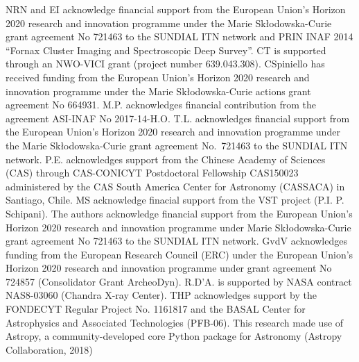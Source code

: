 \documentclass[usenatbib]{mnras}
\begin{document}
NRN and EI acknowledge financial support from the European Union's Horizon
2020 research and innovation programme under the Marie Sk\l{}odowska-Curie
grant agreement No 721463 to the SUNDIAL ITN network and  PRIN INAF 2014 
``Fornax Cluster Imaging and Spectroscopic Deep Survey''.
CT is supported through an NWO-VICI grant (project number 639.043.308).
CSpiniello has received funding from the European Union's Horizon 2020 
research and innovation programme under the Marie Sk\l{}odowska-Curie
actions grant agreement No 664931.
M.P. acknowledges financial contribution from the agreement ASI-INAF No 2017-14-H.O.
T.L. acknowledges financial support from the European Union's Horizon 2020 
research and innovation programme under the Marie Sk\l{}odowska-Curie 
grant agreement No.~721463 to the SUNDIAL ITN network.
P.E. acknowledges support from the Chinese Academy of Sciences (CAS) 
through CAS-CONICYT Postdoctoral  Fellowship CAS150023 administered 
by the CAS South America Center for Astronomy (CASSACA) in Santiago,  Chile.
MS acknowledge finacial support from the VST project (P.I. P. Schipani).
The authors acknowledge financial support from the European Union's 
Horizon 2020 research and innovation programme under Marie Sk\l{}odowska-Curie 
grant agreement No 721463 to the SUNDIAL ITN network.
GvdV acknowledges funding from the European Research Council (ERC) under 
the European Union's Horizon 2020 research and innovation programme 
under grant agreement No 724857 (Consolidator Grant ArcheoDyn).
R.D'A. is supported by NASA contract NAS8-03060 (Chandra X-ray Center).
THP acknowledges support by the FONDECYT Regular Project No. 1161817 and 
the BASAL Center for Astrophysics and Associated Technologies (PFB-06).
This research made use of Astropy, a community-developed core Python 
package for Astronomy (Astropy Collaboration, 2018)



\end{document}
